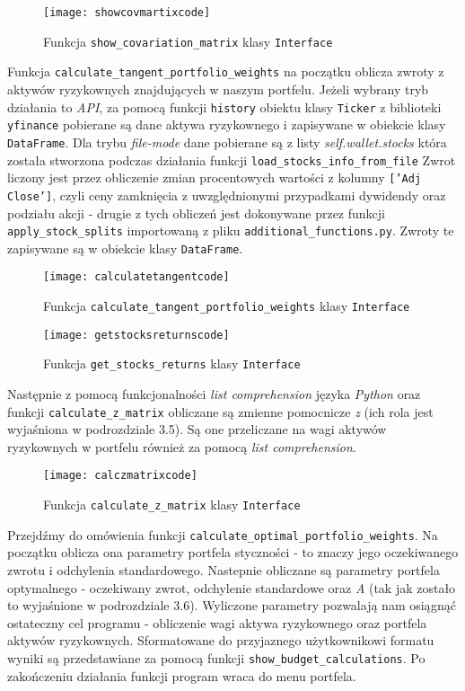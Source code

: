 \documentclass[magister]{dyplom}
\def\code#1{\texttt{#1}}
\begin{document}
\begin{figure}[h]
	\centering
	\texttt{[image: showcovmartixcode]}
	\caption{Funkcja \code{show\_covariation\_matrix} klasy \code{Interface}}
\end{figure}
\newpage
Funkcja \code{calculate\_tangent\_portfolio\_weights} na początku oblicza zwroty z aktywów ryzykownych znajdujących w naszym portfelu. Jeżeli wybrany tryb działania to \textit{API}, za pomocą funkcji \code{history} obiektu klasy \code{Ticker} z biblioteki \code{yfinance} pobierane są dane aktywa ryzykownego i zapisywane w obiekcie klasy \code{DataFrame}. Dla trybu \textit{file-mode} dane pobierane są z listy \textit{self.wallet.stocks} która została stworzona podczas działania funkcji \code{load\_stocks\_info\_from\_file}  Zwrot liczony jest przez obliczenie zmian procentowych wartości z kolumny \code{['Adj Close']}, czyli ceny zamknięcia z uwzględnionymi przypadkami dywidendy oraz podziału akcji - drugie z tych obliczeń jest dokonywane przez funkcji \code{apply\_stock\_splits} importowaną z pliku \code{additional\_functions.py}. Zwroty te zapisywane są w obiekcie klasy \code{DataFrame}.

\begin{figure}[ht]
	\centering
	\texttt{[image: calculatetangentcode]}
	\caption{Funkcja \code{calculate\_tangent\_portfolio\_weights} klasy \code{Interface}}
\end{figure}

\begin{figure}[ht]
	\centering
	\texttt{[image: getstocksreturnscode]}
	\caption{Funkcja \code{get\_stocks\_returns} klasy \code{Interface}}
\end{figure}

Następnie z pomocą funkcjonalności \textit{list comprehension} języka \textit{Python}\cite{pythonlist} oraz funkcji \code{calculate\_z\_matrix} obliczane są zmienne pomocnicze \textit{z} (ich rola jest wyjaśniona w podrozdziale 3.5). Są one przeliczane na wagi aktywów ryzykownych w portfelu również za pomocą \textit{list comprehension}.

\begin{figure}[ht]
	\centering
	\texttt{[image: calczmatrixcode]}
	\caption{Funkcja \code{calculate\_z\_matrix} klasy \code{Interface}}
\end{figure}
\newpage
Przejdźmy do omówienia funkcji \code{calculate\_optimal\_portfolio\_weights}. Na początku oblicza ona parametry portfela styczności - to znaczy jego oczekiwanego zwrotu i odchylenia standardowego. Nastepnie obliczane są parametry portfela optymalnego - oczekiwany zwrot, odchylenie standardowe oraz \textit{A} (tak jak zostało to wyjaśnione w podrozdziale 3.6). Wyliczone parametry pozwalają nam osiągnąć ostateczny cel programu - obliczenie wagi aktywa ryzykownego oraz portfela aktywów ryzykownych. Sformatowane do przyjaznego użytkownikowi formatu wyniki są przedstawiane za pomocą funkcji \code{show\_budget\_calculations}. Po zakończeniu działania funkcji program wraca do menu portfela.
\end{document}
